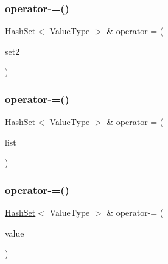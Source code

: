 \subsubsection{\texorpdfstring{operator-\/=()}{operator-=()}\hspace{0.1cm}{\footnotesize\ttfamily [1/3]}}
{\footnotesize\ttfamily \mbox{\hyperlink{classHashSet}{Hash\+Set}}$<$ Value\+Type $>$ \& operator-\/= (\begin{DoxyParamCaption}\item[{const \mbox{\hyperlink{classHashSet}{Hash\+Set}}$<$ Value\+Type $>$ \&}]{set2 }\end{DoxyParamCaption})}

\mbox{\label{classHashSet_ac3c755a24c652eb7ae7364da211d4188}} 
\subsubsection{\texorpdfstring{operator-\/=()}{operator-=()}\hspace{0.1cm}{\footnotesize\ttfamily [2/3]}}
{\footnotesize\ttfamily \mbox{\hyperlink{classHashSet}{Hash\+Set}}$<$ Value\+Type $>$ \& operator-\/= (\begin{DoxyParamCaption}\item[{std\+::initializer\+\_\+list$<$ Value\+Type $>$}]{list }\end{DoxyParamCaption})}

\mbox{\label{classHashSet_aedaa1e0349df4cde2e3e56659e78f51f}} 
\subsubsection{\texorpdfstring{operator-\/=()}{operator-=()}\hspace{0.1cm}{\footnotesize\ttfamily [3/3]}}
{\footnotesize\ttfamily \mbox{\hyperlink{classHashSet}{Hash\+Set}}$<$ Value\+Type $>$ \& operator-\/= (\begin{DoxyParamCaption}\item[{const Value\+Type \&}]{value }\end{DoxyParamCaption})}

\mbox{\label{classHashSet_ad65fa98dcd20bd11d6bd466d15f20472}} 
